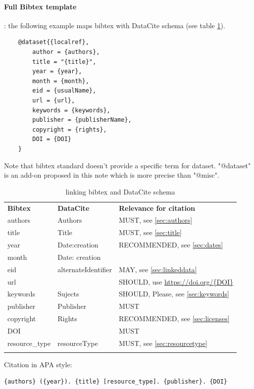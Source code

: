 \documentclass[11pt,a4paper]{ivoa}
\begin{document}
\paragraph{Full Bibtex template} : the following example maps bibtex with DataCite schema (see table \ref{tab:astroDOIs1}).

\begin{lstlisting}
	@dataset{{localref},
		author = {authors},
		title = "{title}",
		year = {year},
		month = {month},
		eid = {usualName},
		url = {url},
		keywords = {keywords},
		publisher = {publisherName},
		copyright = {rights},
		DOI = {DOI}
	}
\end{lstlisting}

Note that bibtex standard doesn't provide a specific term for dataset. 
"@dataset" is an add-on proposed in this note which is more precise than "@misc".\\

\begin{table}[th]
	\begin{tabular}{lll}
		\sptablerule
		\textbf{Bibtex} & \textbf{DataCite} & \textbf{Relevance for citation} \\
		\sptablerule
		\sptablerule
	authors & Authors & MUST, see \ref{sec:authors} \\
	title & Title & MUST, see \ref{sec:title}\\
	year &  Date:creation & RECOMMENDED, see \ref{sec:dates} \\
	month & Date: creation & \\
	eid & alternateIdentifier & MAY, see \ref{sec:linkeddata}\\
	url & & SHOULD, use \url{https://doi.org/{DOI}} \\
	keywords & Sujects & SHOULD, Please, see \ref{sec:keywords} \\
	publisher & Publisher & MUST \\
    copyright & Rights & RECOMMENDED, see \ref{sec:licenses} \\
    DOI & & MUST \\
    resource\_type  & resourceType & MUST, see \ref{sec:resourcetype}\\
    \sptablerule
	\end{tabular}%
\caption{\label{tab:astroDOIs1}linking bibtex and DataCite schema}
\end{table}

Citation in APA style:
\begin{verbatim}
{authors} ({year}). {title} [resource_type]. {publisher}. {DOI}
\end{verbatim}
\end{document}
